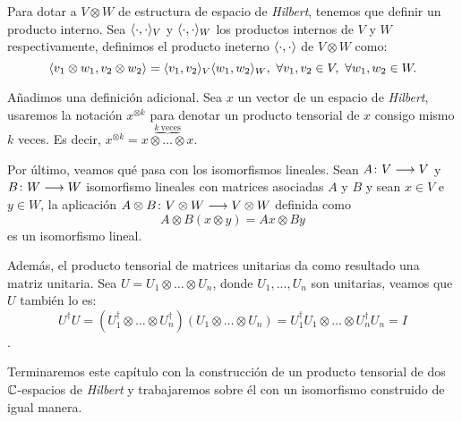 Para dotar a $V\otimes W$ de estructura de espacio de \textit{Hilbert}, tenemos que definir un producto interno. Sea $\langle\cdot,\cdot\rangle_V$ y $\langle\cdot,\cdot\rangle_W$ los productos internos de $V$ y $W$ respectivamente, definimos el producto ineterno $\langle\cdot,\cdot\rangle$ de $V\otimes W$ como:
\begin{equation}
\dotproduct{v_1\otimes w_1}{v_2\otimes w_2}=\dotproduct{v_1}{v_2}_V\dotproduct{w_1}{w_2}_W,\ \forall v_1,v_2\in V,\ \forall w_1,w_2\in W.
\end{equation}

Añadimos una definición adicional. Sea $x$ un vector de un espacio de \textit{Hilbert}, usaremos la notación $x^{\otimes k}$ para denotar un producto tensorial de $x$ consigo mismo $k$ veces. Es decir,\newline
$x^{\otimes k}=\overset{\underbrace{k\mathrm{\ veces}}}{x\otimes \hdots \otimes x}$.

Por último, veamos qué pasa con los isomorfismos lineales. Sean $A\colon V\longrightarrow V$ y \newline $B\colon W\longrightarrow W$ isomorfismo lineales con matrices asociadas $A$ y $B$ y sean $x\in V$ e $y\in W$, la aplicación $A\otimes B\colon V\otimes W\longrightarrow V\otimes W$ definida como
\begin{equation}
A\otimes B(x\otimes y) = Ax\otimes By
\end{equation}
es un isomorfismo lineal.

Además, el producto tensorial de matrices unitarias da como resultado una matriz unitaria. Sea $U=U_1\otimes\hdots\otimes U_n$, donde $U_1,...,U_n$ son unitarias, veamos que $U$ también lo es:
\[U^\dag U = (U_1^\dag\otimes\hdots\otimes U_n^\dag)(U_1\otimes\hdots\otimes U_n)=U_1^\dag U_1\otimes\hdots\otimes U_n^\dag U_n = I\].

Terminaremos este capítulo con la construcción de un producto tensorial de dos $\mathbb{C}$-espacios de \textit{Hilbert} y trabajaremos sobre él con un isomorfismo construido de igual manera.

